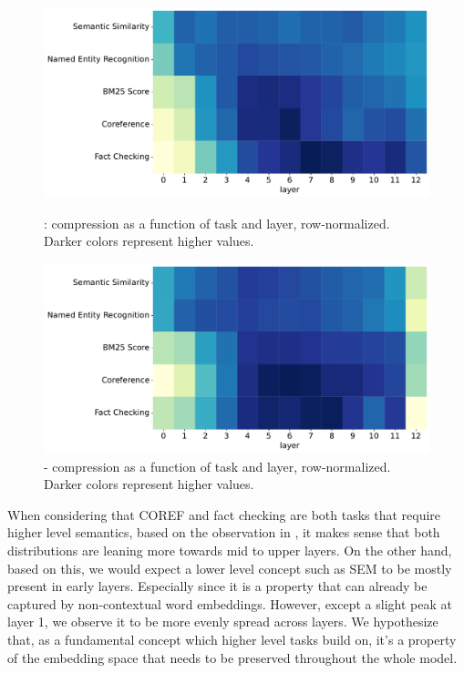 \begin{figure}[!ht]
    \includegraphics[width=\textwidth]{gfx/probing/heatmap_compression_base}
    \caption{: compression as a function of task and layer, row-normalized. Darker colors represent higher values.}
    \label{fig:heatmap_comp_base}

    \includegraphics[width=\textwidth]{gfx/probing/heatmap_compression_passage}
    \caption{ - compression as a function of task and layer, row-normalized. Darker colors represent higher values.}
    \label{fig:heatmap_comp_passage}
\end{figure}

When considering that COREF and fact checking are both tasks that require higher level semantics, based on the observation in \cite{tenney-etal-2019-bert}, it makes sense that both distributions are leaning more towards mid to upper layers. On the other hand, based on this, we would expect a lower level concept such as SEM to be mostly present in early layers. Especially since it is a property that can already be captured by non-contextual word embeddings. However, except a slight peak at layer 1, we observe it to be more evenly spread across layers. We hypothesize that, as a fundamental concept which higher level tasks build on, it's a property of the embedding space that needs to be preserved throughout the whole model.

